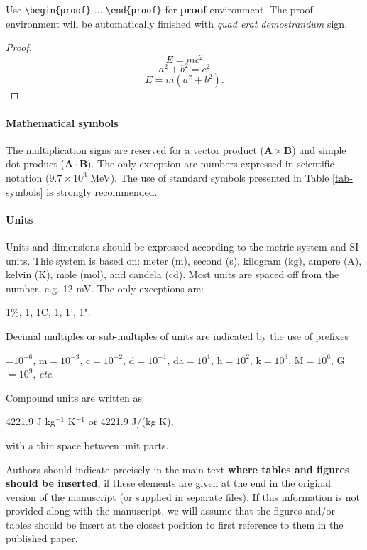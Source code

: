 \documentclass[CEJCS,PDF]{cej} %
\begin{document}
Use {\tt \verb+\begin{proof}+} ... {\tt \verb+\end{proof}+} for {\bf proof} environment.
The proof environment will be automatically finished with {\em quad erat demostrandum} sign.
\begin{proof}
\[ E=mc^2 \]
\[ a^2+b^2=c^2 \]
\[ E=m(a^2+b^2). \]
\end{proof}

\paragraph{Mathematical symbols}
    The multiplication signs are reserved for a vector product ($\mathbf{A}\times\mathbf{B}$) and simple dot product ($\mathbf{A}\cdot\mathbf{B}$). The only exception are numbers expressed in scientific notation ($9.7\times 10^3$ MeV).
    The use of standard symbols presented in Table \ref{tab-symbols} is strongly recommended.

\paragraph{Units}
    Units and dimensions should be expressed according to the metric system and SI units. This system is based on: meter (m), second (s), kilogram (kg), ampere (A), kelvin (K), mole (mol), and candela (cd). Most units are spaced off from the number, e.g. 12 mV. The only exceptions are:
\begin{center}
    1\%, 1\textperthousand, 1\textdegree C, 1\textdegree, 1', 1".
\end{center}

    Decimal multiples or sub-multiples of units are indicated by the use of prefixes

\begin{center}
    \textmu=$10^{-6}$, m$=10^{-3}$, c$=10^{-2}$, d$=10^{-1}$,
    da$=10^1$, h$=10^2$, k$=10^3$, M$=10^6$, G$=10^9$, {\em etc}.
\end{center}

    Compound units are written as
\begin{center}
    4221.9 J kg$^{-1}$ K$^{-1}$ or 4221.9 J/(kg K),
\end{center}
    with a thin space between unit parts.


    Authors should indicate precisely in the main text {\bf where tables and figures should be inserted}, if these elements are given at the end in the original version of the manuscript (or supplied in separate files).
    If this information is not provided along with the manuscript, we will assume that the figures and/or tables should be insert at the closest position to first reference to them in the published paper.
\end{document}
